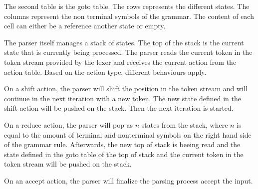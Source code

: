 The second table is the goto table. The rows represents the different states. The columns represent the non terminal symbols of the grammar. The content of each cell can either be a reference another state or empty.

The parser itself manages a stack of states. The top of the stack is the current state that is currently being processed. The parser reads the current token in the token stream provided by the lexer and receives the current action from the action table.
Based on the action type, different behaviours apply.

On a shift action, the parser will shift the position in the token stream and will continue in the next iteration with a new token. The new state defined in the shift action will be pushed on the stack. Then the next iteration is started.

On a reduce action, the parser will pop as $n$ states from the stack, where $n$ is equal to the amount of terminal and nonterminal symbols on the right hand side of the grammar rule. Afterwards, the new top of stack is beeing read and the state defined in the goto table of the top of stack and the current token in the token stream will be pushed on the stack.

On an accept action, the parser will finalize the parsing process accept the input. 
